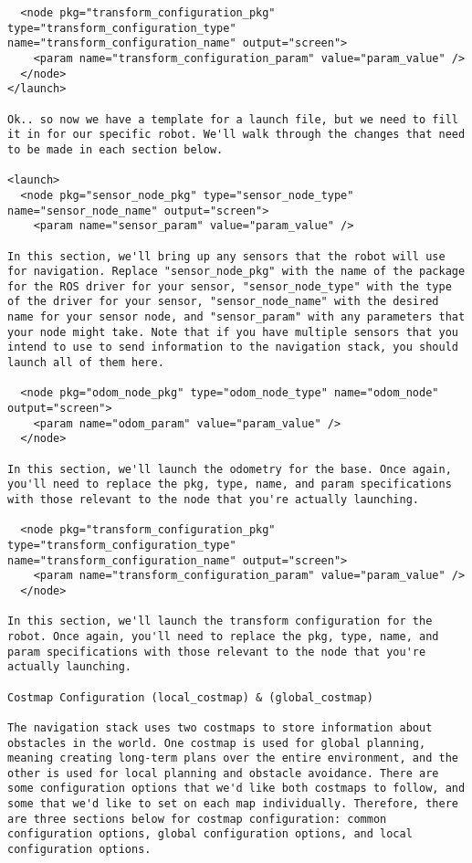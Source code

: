 \begin{verbatim}
  <node pkg="transform_configuration_pkg" type="transform_configuration_type" name="transform_configuration_name" output="screen">
    <param name="transform_configuration_param" value="param_value" />
  </node>
</launch>

Ok.. so now we have a template for a launch file, but we need to fill it in for our specific robot. We'll walk through the changes that need to be made in each section below.

<launch>
  <node pkg="sensor_node_pkg" type="sensor_node_type" name="sensor_node_name" output="screen">
    <param name="sensor_param" value="param_value" />

In this section, we'll bring up any sensors that the robot will use for navigation. Replace "sensor_node_pkg" with the name of the package for the ROS driver for your sensor, "sensor_node_type" with the type of the driver for your sensor, "sensor_node_name" with the desired name for your sensor node, and "sensor_param" with any parameters that your node might take. Note that if you have multiple sensors that you intend to use to send information to the navigation stack, you should launch all of them here.

  <node pkg="odom_node_pkg" type="odom_node_type" name="odom_node" output="screen">
    <param name="odom_param" value="param_value" />
  </node>

In this section, we'll launch the odometry for the base. Once again, you'll need to replace the pkg, type, name, and param specifications with those relevant to the node that you're actually launching.

  <node pkg="transform_configuration_pkg" type="transform_configuration_type" name="transform_configuration_name" output="screen">
    <param name="transform_configuration_param" value="param_value" />
  </node>

In this section, we'll launch the transform configuration for the robot. Once again, you'll need to replace the pkg, type, name, and param specifications with those relevant to the node that you're actually launching.

Costmap Configuration (local_costmap) & (global_costmap)

The navigation stack uses two costmaps to store information about obstacles in the world. One costmap is used for global planning, meaning creating long-term plans over the entire environment, and the other is used for local planning and obstacle avoidance. There are some configuration options that we'd like both costmaps to follow, and some that we'd like to set on each map individually. Therefore, there are three sections below for costmap configuration: common configuration options, global configuration options, and local configuration options.


\end{verbatim}
